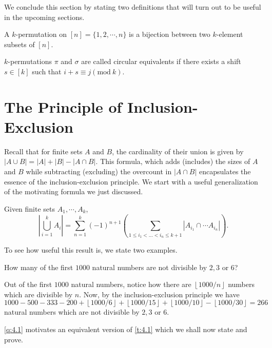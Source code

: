 We conclude this section by stating two definitions that will turn out to be useful in the upcoming sections.
\begin{definition}[$k$-Permutation]
A $k$-permutation on $[n]=\{1,2,\cdots,n\}$ is a bijection between two $k$-element subsets of $[n]$. 
\end{definition}
\begin{definition}
	$k$-permutations  $\pi$ and $\sigma$ are called circular equivalents if there exists a shift  $s\in [k]$ such that  $i+s\equiv j(\text{mod} \ k)$.
\end{definition}
\section{The Principle of Inclusion-Exclusion}
Recall that for finite sets $A$ and $B$, the cardinality of their union is given by $|A \cup B| = |A| + |B| - |A \cap B|
$. This formula, which adds (includes) the sizes of $A$ and $B$ while subtracting (excluding) the overcount in $|A \cap B|$ encapsulates the essence of the inclusion-exclusion principle. We start with a useful generalization of the motivating formula we just discussed.
\begin{theorem}
	Given finite sets $A_{1},\cdots,A_{k}$, 
	\[
		|\bigcup_{i=1}^k A_i| = \sum_{n=1}^{k}\left(-1  \right)^{n+1}\left( \sum_{1\leq i_{1}<\ldots<i_{n}\leq k+1}|A_{i_{1}}\cap \cdots A_{i_{n}}| \right) 
	.\] 
 \label{t:4.1}
\end{theorem}
To see how useful this result is, we state two examples.
\begin{question}
How many of the first $1000$ natural numbers are not divisible by $2,3$ or $6$? \label{q:4.1}
\end{question}
\begin{solution}
Out of the first $1000$ natural numbers, notice how there are $\left \lfloor{1000/n}\right \rfloor$ numbers which are divisible by $n$. Now, by the inclusion-exclusion principle we have 
\[
1000-500-333-200+\left \lfloor{1000/6}\right \rfloor+\left \lfloor{1000/15}\right \rfloor+\left \lfloor{1000/10}\right \rfloor-\left \lfloor{1000/30}\right \rfloor=266
\]
natural numbers which are not divisible by $2,3$ or $6$. 
\end{solution}
\cref{q:4.1} motivates an equivalent version of \cref{t:4.1} which we shall now state and prove.
